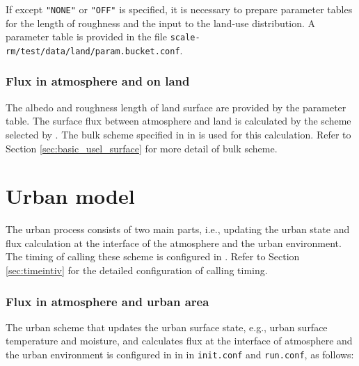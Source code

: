 If  except \verb|"NONE"| or \verb|"OFF"| is specified,
it is necessary to prepare parameter tables for the length of roughness and the input to the land-use distribution.
A parameter table is provided
in the file \verb|scale-rm/test/data/land/param.bucket.conf|.\\

\subsubsection{Flux in atmosphere and on land}
The albedo and roughness length of land surface are provided by the parameter table. The surface flux between atmosphere and land is calculated by the scheme selected by . The bulk scheme specified in  in  is used for this calculation. Refer to Section \ref{sec:basic_usel_surface} for more detail of bulk scheme.



\section{Urban model} \label{sec:basic_usel_urban}
The urban process consists of two main parts, i.e., updating the urban state and flux calculation at the interface of the atmosphere and the urban environment. The timing of calling these scheme is configured in . Refer to Section \ref{sec:timeintiv} for the detailed configuration of calling timing.

\subsubsection{Flux in atmosphere and urban area}

The urban scheme that updates the urban surface state, e.g., urban surface temperature and moisture, and calculates flux at the interface of atmosphere and the urban environment is configured in  in  in \verb|init.conf| and \verb|run.conf|, as follows:


